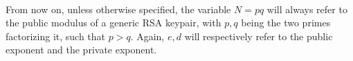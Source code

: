 \paragraph{}
From now on, unless otherwise specified, the variable $N=pq$ will always refer
to the public modulus of a generic RSA keypair, with
$p, q$ being the two primes factorizing it, such that $p > q$.
 Again, $e, d$ will respectively refer to the public
exponent and the private exponent.

